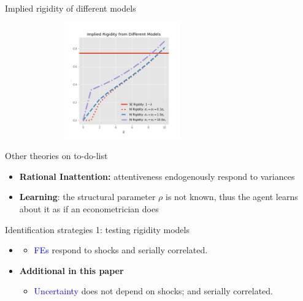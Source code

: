 \documentclass{beamer}
\begin{document}
\begin{frame}{Implied rigidity of different models}


\begin{figure}
	\includegraphics[height=5cm,width=8cm]{figuresDraft/rigidity} 
\end{figure}

\end{frame}



\begin{frame}{Other theories on to-do-list}
\begin{itemize}
	\item \textbf{Rational Inattention:} attentiveness endogenously respond to variances
	\item \textbf{Learning}: the structural parameter $\rho$ is not known, thus the agent learns about it as if an econometrician does
\end{itemize}
\end{frame}

\begin{frame}{Identification strategies 1: testing rigidity models}

\begin{itemize}
	\item\cite{coibion2012can}
	\begin{itemize}
		\item \textcolor{blue}{FEs} respond to shocks and serially correlated. 
	\end{itemize}
	\item \textbf{Additional in this paper}
	\begin{itemize}
		\item \textcolor{blue}{Uncertainty} does not depend on shocks; and serially correlated. 
	\end{itemize}
\end{itemize}

\end{frame}
\end{document}
